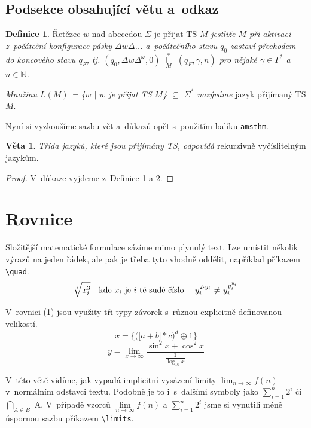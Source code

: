\documentclass[twocolumn, a4paper, 11pt]{article}
\theoremstyle{definition}
\newtheorem{definition}{Definice}
\newtheorem{sentence}{Věta}
\begin{document}
\subsection{Podsekce obsahující větu a~odkaz}
\begin{definition}
Řetězec $w$ nad abecedou $\Sigma$ je přijat TS $M$ \emph{jestliže $M$ při aktivaci z~počáteční konfigurace pásky  \underline{$\Delta$}$w\Delta$... a~počátečního stavu $q_0$ zastaví přechodem do koncového stavu $q_F$, tj. $(q_0, \Delta w\Delta^\omega, 0)$ $\overset{\ast}{\underset{M}{\vdash}}$ $(q_F, \gamma, n)$ pro nějaké $\gamma \in \Gamma^\ast$ a $n \in \mathbb{N}$.}\par
\emph{Množinu $L(M)$ = \{$w$ $|$ $w$ je přijat TS $M$\} $\subseteq$ $\Sigma^\ast$ nazýváme} jazyk přijímaný TS $M$.\end{definition}
Nyní si vyzkoušíme sazbu vět a~důkazů opět s~použitím
balíku \verb|amsthm|.
\begin{sentence} 
\emph{Třída jazyků, které jsou přijímány TS, odpovídá} rekurzivně vyčíslitelným jazykům.
\end{sentence}
\begin{proof} V~důkaze vyjdeme z~Definice 1 a 2.\end{proof}
\section{Rovnice}
Složitější matematické formulace sázíme mimo plynulý
text. Lze umístit několik výrazů na jeden řádek, ale pak je
třeba tyto vhodně oddělit, například příkazem \verb|\quad|.
\vspace{4mm}
\begin{equation*}
    \sqrt[i]{x^3_i} \quad \text{kde $x_i$ je $i$-té sudé číslo \quad $y_i^{2\cdot y_i}$ $\neq$ $y_i^{y_i^{y_i}}$}
\end{equation*}
\par V~rovnici (1) jsou využity tři typy závorek s~různou
explicitně definovanou velikostí.
\vspace{4mm}
\begin{equation}
       x = \bigg\{ \Big( \big[ a + b \big] \ast c \Big)^d \oplus 1 \bigg\}
\end{equation}
\begin{equation}
    y = \lim_{x\to\infty} \frac{\sin ^2 x + \cos ^2 x}{\frac{1}{\log_{10} x}}
\end{equation}
\par V~této větě vidíme, jak vypadá implicitní vysázení limity $\lim_{n\to\infty} f(n)$ v~normálním odstavci textu. Podobně je to i~s~dalšími symboly jako $\sum_{i=1}^{n} 2^{i}$
či $\bigcap_{A\in B}$ A. V~případě vzorců $\lim\limits_{n\to\infty} f(n)$ a $\sum\limits_{i=1}^{n} 2^{i}$ jsme si vynutili méně úspornou sazbu příkazem \verb|\limits|.
\end{document}
